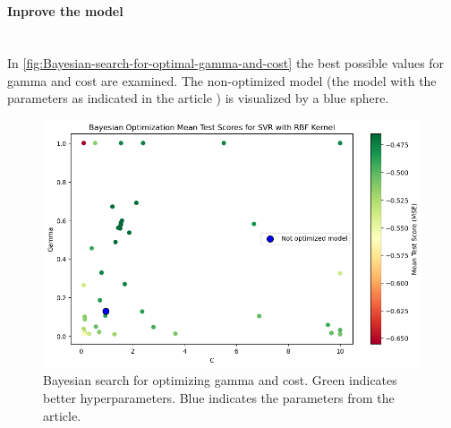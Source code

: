 \documentclass{article}
\newcommand{\subsubsubsection}[1]{%
  \paragraph{#1}\mbox{}\\}
\begin{document}
\subsubsubsection{Inprove the model}

In \autoref{fig:Bayesian-search-for-optimal-gamma-and-cost} the best possible values for gamma and cost are examined. The non-optimized model (the model with the parameters as indicated in the article \cite{dahal2021prediction} ) is visualized by a blue sphere.
\begin{figure}
    \centering
    \includegraphics[width=\linewidth]{figures/bayesian_optimization.png}
    \caption{Bayesian search for optimizing gamma and cost. Green indicates better hyperparameters. Blue indicates the parameters from the article.}
    \label{fig:Bayesian-search-for-optimal-gamma-and-cost}
\end{figure}
\end{document}
